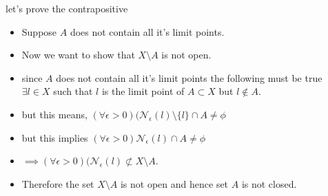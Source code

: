 \documentclass[12pt,a4paper]{article}
\begin{document}
let's prove the contrapositive
\begin{itemize}
    \item Suppose \(A\) does not contain all it's limit points.
    \item Now we want to show that \(X\setminus A\) is not open.
    \item since \(A\) does not contain all it's limit points the following must be true
    \(\exists l \in X \) such that \(l\) is the limit point of \(A \subset X\) but \(l \notin A\).
    \item but this means, \((\forall \epsilon >0)(\mathcal{N}_{\epsilon}(l)\setminus \{l\}\cap A \neq \phi\)
    \item but this implies \((\forall \epsilon >0)\mathcal{N}_{\epsilon}(l)\cap A \neq \phi\) 
    \item \(\implies (\forall \epsilon > 0)(\mathcal{N}_{\epsilon}(l) \not\subset X\setminus A\).
    \item Therefore the set \(X \setminus A\) is not open and hence set \(A\) is not closed.                  
\end{itemize}
\end{document}
